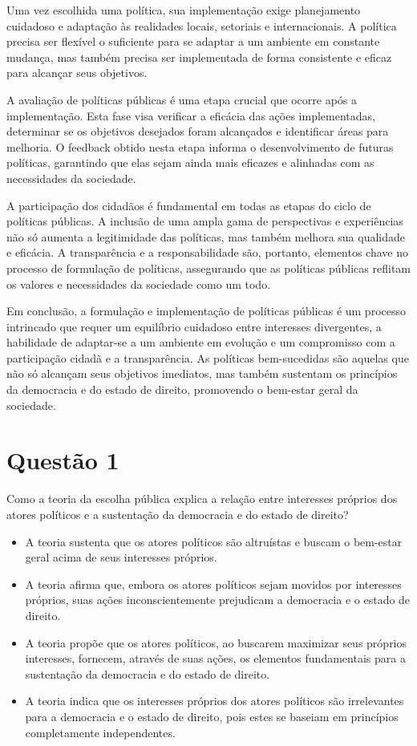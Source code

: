 \documentclass[
   article,       
   12pt,          
   oneside,       
   a4paper,       
   english,       
   brazil,        
   sumario=tradicional
   ]{abntex2}
\begin{document}
Uma vez escolhida uma política, sua implementação exige planejamento cuidadoso e adaptação às realidades locais, setoriais e internacionais. A política precisa ser flexível o suficiente para se adaptar a um ambiente em constante mudança, mas também precisa ser implementada de forma consistente e eficaz para alcançar seus objetivos.

A avaliação de políticas públicas é uma etapa crucial que ocorre após a implementação. Esta fase visa verificar a eficácia das ações implementadas, determinar se os objetivos desejados foram alcançados e identificar áreas para melhoria. O feedback obtido nesta etapa informa o desenvolvimento de futuras políticas, garantindo que elas sejam ainda mais eficazes e alinhadas com as necessidades da sociedade.

A participação dos cidadãos é fundamental em todas as etapas do ciclo de políticas públicas. A inclusão de uma ampla gama de perspectivas e experiências não só aumenta a legitimidade das políticas, mas também melhora sua qualidade e eficácia. A transparência e a responsabilidade são, portanto, elementos chave no processo de formulação de políticas, assegurando que as políticas públicas reflitam os valores e necessidades da sociedade como um todo.

Em conclusão, a formulação e implementação de políticas públicas é um processo intrincado que requer um equilíbrio cuidadoso entre interesses divergentes, a habilidade de adaptar-se a um ambiente em evolução e um compromisso com a participação cidadã e a transparência. As políticas bem-sucedidas são aquelas que não só alcançam seus objetivos imediatos, mas também sustentam os princípios da democracia e do estado de direito, promovendo o bem-estar geral da sociedade.
\section{Questão 1}
Como a teoria da escolha pública explica a relação entre interesses próprios dos atores políticos e a sustentação da democracia e do estado de direito?

\begin{itemize}
  \item A teoria sustenta que os atores políticos são altruístas e buscam o bem-estar geral acima de seus interesses próprios.
  \item A teoria afirma que, embora os atores políticos sejam movidos por interesses próprios, suas ações inconscientemente prejudicam a democracia e o estado de direito.
  \item A teoria propõe que os atores políticos, ao buscarem maximizar seus próprios interesses, fornecem, através de suas ações, os elementos fundamentais para a sustentação da democracia e do estado de direito.
  \item A teoria indica que os interesses próprios dos atores políticos são irrelevantes para a democracia e o estado de direito, pois estes se baseiam em princípios completamente independentes.
\end{itemize}
\end{document}
